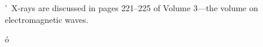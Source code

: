 \documentclass{article}
\begin{document}
\rq\ X-rays are discussed in pages 221--225 of Volume 3---the volume on electromagnetic waves.

\'{o} 
\end{document}

